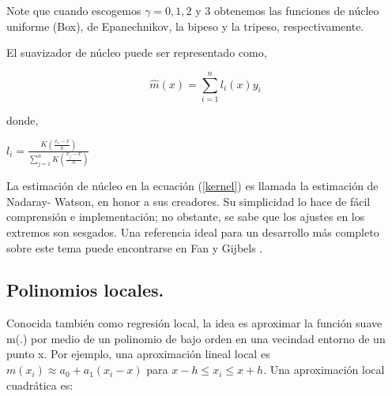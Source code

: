 \hspace*{0.4 cm} Note que cuando escogemos $\gamma = 0, 1, 2$ y $3$ obtenemos las funciones de n\'ucleo uniforme (Box), de Epanechnikov, la bipeso y la tripeso, respectivamente.

\hspace*{0.4 cm} El suavizador de n\'ucleo puede ser representado como,

\vspace*{0.2 cm}


\begin{equation}
\hat{m}(x) = \sum_{i=1}^{n} l_{i}(x) y_{i} 
\label{kernel1}
\end{equation}

\vspace*{0.2 cm}

\noindent donde,

\vspace*{0.2 cm}

\begin{center}
$\displaystyle{l_{i} = \frac{K(\frac{x_{i}-x}{h})}{\sum_{j=1}^{n} K(\frac{x_{j}-x}{h})} }$
\end{center}

\vspace*{0.2 cm}


\hspace*{0.4 cm} La estimaci\'on de n\'ucleo en la ecuaci\'on (\ref{kernel}) es llamada la estimaci\'on de Nadaray- Watson, en honor a sus creadores. Su simplicidad lo hace de f\'acil comprensi\'on e implementaci\'on; no obstante, se sabe que los ajustes en los extremos son sesgados. Una referencia ideal para un desarrollo m\'as completo sobre este tema puede encontrarse en Fan y Gijbels \cite{FG}.

\subsection{Polinomios locales.\\}



\hspace*{0.4 cm} Conocida tambi\'en como regresi\'on local, la idea es aproximar la funci\'on suave m(.) por medio de un polinomio de bajo orden en una vecindad entorno de un punto x. Por ejemplo, una aproximaci\'on lineal local es $m(x_{i}) \approx a_{0} + a_{1}(x_{i}-x)$ para $x - h \leq x_{i} \leq x+h$. Una aproximaci\'on local cuadr\'atica es:

\vspace*{0.2 cm}

